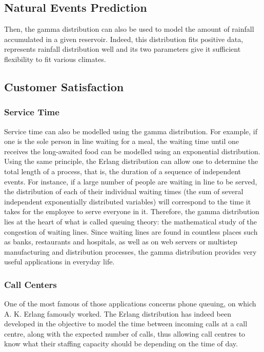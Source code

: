 \documentclass[12pt]{article}
\begin{document}
\subsection{Natural Events Prediction}
Then, the gamma distribution can also be used to model the amount of rainfall accumulated in a given reservoir. Indeed,
this distribution fits positive data, represents rainfall distribution well and its two parameters
give it sufficient flexibility to fit various climates\cite{husakUseGammaDistribution2007}.


\pagebreak
\subsection{Customer Satisfaction}
\subsubsection{Service Time}
Service time can also be modelled using the gamma distribution. For example, if one is the sole person in line waiting for a meal, the
waiting time until one receives the long-awaited food can be modelled using an exponential distribution. Using the same
principle, the Erlang distribution can allow one to determine the total length of a process, that is, the duration of a
sequence of independent events. For instance, if a large number of people are waiting in line to be served, the
distribution of each of their individual waiting times (the sum of several independent exponentially distributed
variables) will correspond to the time it takes for the employee to serve everyone in it. Therefore, the gamma
distribution lies at the heart of what is called queuing theory: the mathematical study of the congestion of waiting
lines. Since waiting lines are found in countless places such as banks, restaurants and hospitals, as well as on web
servers or multistep manufacturing and distribution processes, the gamma distribution provides very useful applications
in everyday life.

\subsubsection{Call Centers}
One of the most famous of those applications concerns phone queuing, on which A. K. Erlang famously worked. The Erlang
distribution has indeed been developed in the objective to model the time between incoming calls at a call centre, along
with the expected number of calls, thus allowing call centres to know what their staffing capacity should be depending
on the time of day.
\end{document}
